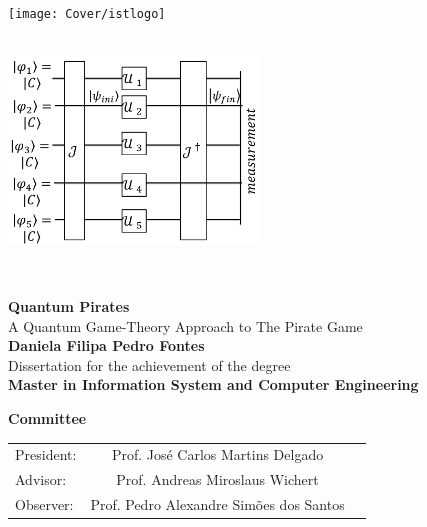 \setcounter{page}{1} 


\thispagestyle{empty}
\begin{flushleft} ~\\ \vspace{-10mm} \hspace{-9mm}  \texttt{[image: Cover/istlogo]} 
\\ \vspace{5mm}
~\\ \begin{center} \includegraphics[height=50mm]{Figures/Cover/esquema.png}  \end{center} %
~\\ \vspace{5mm}
\begin{centering}
\LARGE \textbf{Quantum Pirates}
\\ \vspace{5mm}
\Large A Quantum Game-Theory Approach to The Pirate Game
\\ \vspace{15mm}
\Large \textbf{Daniela Filipa Pedro Fontes}
\\ \vspace{15mm}
\large Dissertation for the achievement of the degree
\\ \vspace{2mm}
\LARGE \textbf{Master in Information System and Computer Engineering}
\\ \vspace{20mm}

\Large \textbf{Committee}
\\ \vspace{7mm}
\begin{tabular}{lcl}
\large President: 	&Prof. Jos\'{e} Carlos Martins Delgado   & \large \\ 
\large Advisor:   &Prof. Andreas Miroslaus Wichert& \large \\ 
\large Observer:	 				&Prof. Pedro Alexandre Sim\~{o}es dos Santos   & \large \\
\end{tabular}
 

\end{centering}
\end{flushleft}
